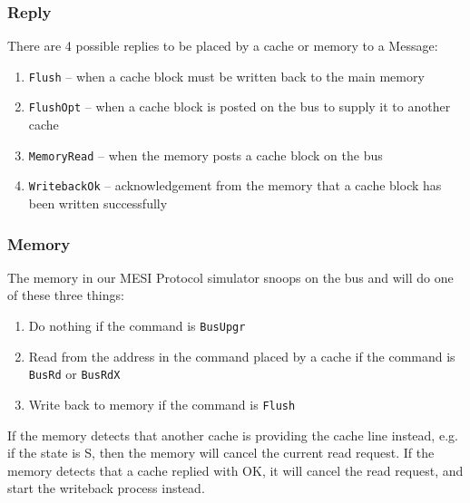 \documentclass[nonacm,acmsmall,screen,11pt]{acmart}
\begin{document}
\subsubsection{Reply}
There are 4 possible replies to be placed by a cache or memory to a Message:
\begin{enumerate}
  \item \texttt{Flush} -- when a cache block must be written back to the main memory
  \item \texttt{FlushOpt} -- when a cache block is posted on the bus to supply it to another cache
  \item \texttt{MemoryRead} -- when the memory posts a cache block on the bus
  \item \texttt{WritebackOk} -- acknowledgement from the memory that a cache block has been written successfully
\end{enumerate}

\subsubsection{Memory}
The memory in our MESI Protocol simulator snoops on the bus and will do one of these three things:
\begin{enumerate}
  \item Do nothing if the command is \texttt{BusUpgr}
  \item Read from the address in the command placed by a cache if the command is \texttt{BusRd} or \texttt{BusRdX}
  \item Write back to memory if the command is \texttt{Flush}
\end{enumerate}

If the memory detects that another cache is providing the cache line instead, e.g. if the state is S, then the memory will cancel the current read request.
If the memory detects that a cache replied with OK, it will cancel the read request, and start the writeback process instead.
\end{document}
